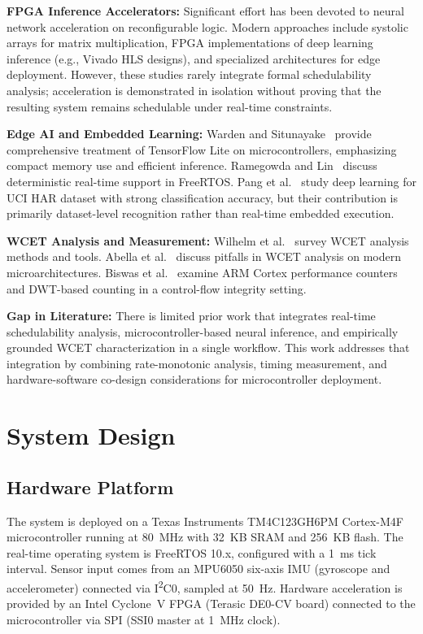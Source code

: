 \documentclass[conference]{IEEEtran}
\begin{document}
\textbf{FPGA Inference Accelerators:} Significant effort has been devoted to neural network acceleration on reconfigurable logic. Modern approaches include systolic arrays for matrix multiplication, FPGA implementations of deep learning inference (e.g., Vivado HLS designs), and specialized architectures for edge deployment. However, these studies rarely integrate formal schedulability analysis; acceleration is demonstrated in isolation without proving that the resulting system remains schedulable under real-time constraints.

\textbf{Edge AI and Embedded Learning:} Warden and Situnayake~\cite{Warden2019} provide comprehensive treatment of TensorFlow Lite on microcontrollers, emphasizing compact memory use and efficient inference. Ramegowda and Lin~\cite{Ramegowda2022} discuss deterministic real-time support in FreeRTOS. Pang et al.~\cite{Pang2022} study deep learning for UCI HAR dataset with strong classification accuracy, but their contribution is primarily dataset-level recognition rather than real-time embedded execution.

\textbf{WCET Analysis and Measurement:} Wilhelm et al.~\cite{Wilhelm2008} survey WCET analysis methods and tools. Abella et al.~\cite{Abella2015} discuss pitfalls in WCET analysis on modern microarchitectures. Biswas et al.~\cite{Biswas2021} examine ARM Cortex performance counters and DWT-based counting in a control-flow integrity setting.

\textbf{Gap in Literature:} There is limited prior work that integrates real-time schedulability analysis, microcontroller-based neural inference, and empirically grounded WCET characterization in a single workflow. This work addresses that integration by combining rate-monotonic analysis, timing measurement, and hardware-software co-design considerations for microcontroller deployment.

\section{System Design}

\subsection{Hardware Platform}

The system is deployed on a Texas Instruments TM4C123GH6PM Cortex-M4F microcontroller running at 80~MHz with 32~KB SRAM and 256~KB flash. The real-time operating system is FreeRTOS 10.x, configured with a 1~ms tick interval. Sensor input comes from an MPU6050 six-axis IMU (gyroscope and accelerometer) connected via I\textsuperscript{2}C0, sampled at 50~Hz. Hardware acceleration is provided by an Intel Cyclone~V FPGA (Terasic DE0-CV board) connected to the microcontroller via SPI (SSI0 master at 1~MHz clock).
\end{document}
